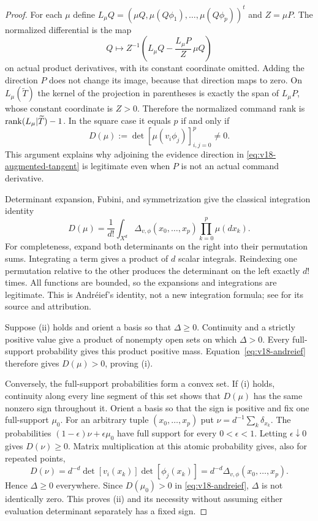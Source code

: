 \documentclass[11pt]{amsart}
\theoremstyle{definition}\newtheorem{definition}[theorem]{Definition}
\theoremstyle{remark}\newtheorem{remark}[theorem]{Remark}
\begin{document}
\begin{proof}
For each $\mu$ define $L_\mu Q=(\mu Q,\mu(Q\phi_1),\ldots,
\mu(Q\phi_p))^t$ and $Z=\mu P$. The normalized differential is the
map
\[
 Q\longmapsto Z^{-1}\left(L_\mu Q-
              \frac{L_\mu P}{Z}\,\mu Q\right)
\]
on actual product derivatives, with its constant coordinate omitted.
Adding the direction $P$ does not change its image, because that
direction maps to zero. On $L_\mu(\widetilde T)$ the kernel of the
projection in parentheses is exactly the span of $L_\mu P$, whose
constant coordinate is $Z>0$. Therefore the normalized command rank
is $\operatorname{rank}(L_\mu|\widetilde T)-1$. In the square case it equals $p$
if and only if
\[
 D(\mu):=\det[\mu(v_i\phi_j)]_{i,j=0}^p\ne0.
\]
This argument explains why adjoining the evidence direction in
\eqref{eq:v18-augmented-tangent} is legitimate even when $P$ is not an
actual command derivative.

Determinant expansion, Fubini, and symmetrization give the classical
integration identity
\begin{equation}\label{eq:v18-andreief}
 D(\mu)=\frac1{d!}\int_{X^d}\Delta_{v,\phi}(x_0,\ldots,x_p)
                     \prod_{k=0}^p\mu(dx_k).
\end{equation}
For completeness, expand both determinants on the right into their
permutation sums. Integrating a term gives a product of $d$ scalar
integrals. Reindexing one permutation relative to the other produces
the determinant on the left exactly $d!$ times. All functions are
bounded, so the expansions and integrations are legitimate. This is
Andr\'eief's identity, not a new integration formula; see
\cite{ForresterAndreief} for its source and attribution.

Suppose \textup{(ii)} holds and orient a basis so that $\Delta\ge0$.
Continuity and a strictly positive value give a product of nonempty
open sets on which $\Delta>0$. Every full-support probability gives
this product positive mass. Equation~\eqref{eq:v18-andreief} therefore
gives $D(\mu)>0$, proving \textup{(i)}.

Conversely, the full-support probabilities form a convex set. If
\textup{(i)} holds, continuity along every line segment of this set
shows that $D(\mu)$ has the same nonzero sign throughout it. Orient a
basis so that the sign is positive and fix one full-support $\mu_0$.
For an arbitrary tuple $(x_0,\ldots,x_p)$ put
$\nu=d^{-1}\sum_k\delta_{x_k}$. The probabilities
$(1-\epsilon)\nu+\epsilon\mu_0$ have full support for every
$0<\epsilon<1$. Letting $\epsilon\downarrow0$ gives $D(\nu)\ge0$.
Matrix multiplication at this atomic probability gives, also for
repeated points,
\[
 D(\nu)=d^{-d}\det[v_i(x_k)]\det[\phi_j(x_k)]
       =d^{-d}\Delta_{v,\phi}(x_0,\ldots,x_p).
\]
Hence $\Delta\ge0$ everywhere. Since $D(\mu_0)>0$ in
\eqref{eq:v18-andreief}, $\Delta$ is not identically zero. This proves
\textup{(ii)} and its necessity without assuming either evaluation
determinant separately has a fixed sign.


\end{proof}
\end{document}
